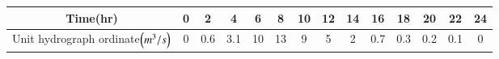 \begin{tabular}[12pt]{|c| c| c| c| c| c| c| c| c| c| c| c| c| c|}
\hline
Time(hr) & 0 & 2 & 4 & 6 & 8 & 10 & 12 & 14 & 16 & 18 & 20 & 22 & 24\\
\hline
Unit hydrograph ordinate$\left(m^3/s\right)$ & 0 & 0.6 & 3.1 & 10 & 13 & 9 & 5 & 2 & 0.7 & 0.3 & 0.2 & 0.1 & 0\\
\hline
\end{tabular}
